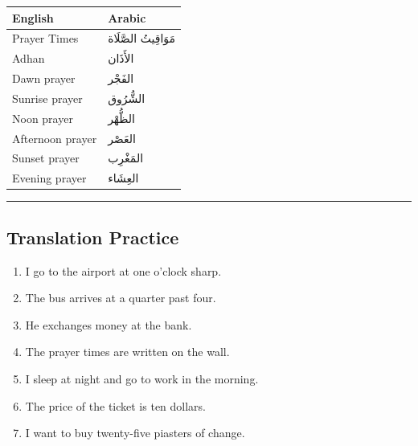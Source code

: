 \documentclass[
  a4paper,
  DIV=11,
  numbers=noendperiod]{scrartcl}
\providecommand{\tightlist}{%
  \setlength{\itemsep}{0pt}\setlength{\parskip}{0pt}}
\begin{document}
\begin{longtable}[]{@{}ll@{}}
\toprule\noalign{}
English & Arabic \\
\midrule\noalign{}
\endhead
\bottomrule\noalign{}
\endlastfoot
Prayer Times & مَوَاقِيتُ الصَّلَاة \\
Adhan & الأَذَان \\
Dawn prayer & الفَجْر \\
Sunrise prayer & الشُّرُوق \\
Noon prayer & الظُّهْر \\
Afternoon prayer & العَصْر \\
Sunset prayer & المَغْرِب \\
Evening prayer & العِشَاء \\
\end{longtable}

\begin{center}\rule{0.5\linewidth}{0.5pt}\end{center}

\subsection{Translation Practice}\label{translation-practice}

\begin{tcolorbox}[enhanced jigsaw, bottomrule=.15mm, arc=.35mm, colbacktitle=quarto-callout-note-color!10!white, opacityback=0, toptitle=1mm, title=\textcolor{quarto-callout-note-color}{\faInfo}\hspace{0.5em}{Translate the following into Arabic}, colframe=quarto-callout-note-color-frame, opacitybacktitle=0.6, colback=white, coltitle=black, titlerule=0mm, left=2mm, toprule=.15mm, bottomtitle=1mm, rightrule=.15mm, leftrule=.75mm, breakable]

\begin{enumerate}
\def\labelenumi{\arabic{enumi}.}
\tightlist
\item
  I go to the airport at one o'clock sharp.
\item
  The bus arrives at a quarter past four.
\item
  He exchanges money at the bank.
\item
  The prayer times are written on the wall.
\item
  I sleep at night and go to work in the morning.
\item
  The price of the ticket is ten dollars.
\item
  I want to buy twenty-five piasters of change.
\end{enumerate}

\end{tcolorbox}
\end{document}
